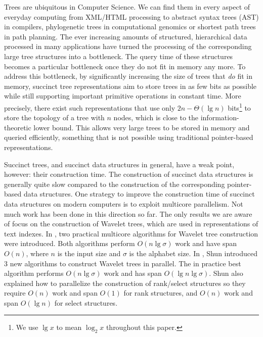 Trees are ubiquitous in Computer Science.
We can find them in every aspect of everyday computing from XML/HTML processing
to abstract syntax trees (AST) in compilers, phylogenetic trees in computational
genomics or shortest path trees in path planning.
The ever increasing amounts of structured, hierarchical data processed in
many applications have turned the processing of the corresponding large tree
structures into a bottleneck.
The query time of these structures becomes a particular bottleneck once they
do not fit in memory any more.
To address this bottleneck, by significantly increasing the size of trees
that \emph{do} fit in memory, succinct tree representations aim to store trees
in as few bits as possible while still supporting important primitive operations
in constant time.
More precisely, there exist such representations that use only
$2n - \Theta(\lg n)$ bits\footnote{We use $\lg x$ to mean
  $\log_{2}x$ throughout this paper.} to store the topology of a tree with $n$
nodes, which is close to the information-theoretic lower bound.
This allows very large trees to be stored in memory and queried efficiently,
something that is not possible using traditional pointer-based representations.

Succinct trees, and succinct data structures in general, have a weak point,
however: their construction time.
The construction of succinct data structures is generally quite slow compared to
the construction of the corresponding pointer-based data structures.
One strategy to improve the construction time of succinct data structures
on modern computers is to exploit multicore parallelism.
Not much work has been done in this direction so far.
The only results we are aware of focus on the construction of Wavelet trees,
which are used in representations of text indexes.
In \cite{Fuentes2014}, two practical multicore algorithms
for Wavelet tree construction were introduced.
Both algorithms perform $O(n\lg \sigma)$ work and have span $O(n)$, where $n$
is the input size and $\sigma$ is the alphabet size.
In \cite{DBLP:journals/corr/Shun14}, Shun introduced 3 new algorithms to
construct Wavelet trees in parallel.
The in practice best algorithm performs $O(n\lg \sigma)$ work and has span
$O(\lg n\lg \sigma)$.
Shun also explained how to parallelize the construction of
rank/select structures so they require $O(n)$ work and span $O(1)$ for rank
structures, and $O(n)$ work and span $O(\lg n)$ for select structures.

